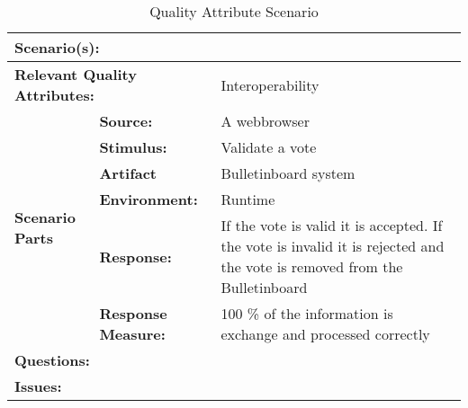 \begin{table}[H]
\begin{center}
\begin{tabular}{|p{0.3cm}|p{2.5cm}|p{8cm}|}
  \hline
  \multicolumn{2}{|p{3cm}|}{\bfseries Scenario(s):} & \\
  \hline
  \multicolumn{2}{|p{3cm}|}{\bfseries Relevant Quality Attributes:} & Interoperability\\
  \hline
  \multirow{6}{*}{\begin{sideways}{\bfseries Scenario Parts}\end{sideways}}
  & {\bfseries Source:} & A webbrowser \\
  \cline{2-3}
  & {\bfseries Stimulus:} & Validate a vote \\
  \cline{2-3}
  & {\bfseries Artifact} &  Bulletinboard system \\
  \cline{2-3}
  & {\bfseries Environment:} &  Runtime \\
  \cline{2-3}
  & {\bfseries Response:} &  If the vote is valid it is accepted. If the vote is invalid it is rejected and the vote is removed from the Bulletinboard \\
  \cline{2-3}
  & {\bfseries Response Measure:} & 100 \% of the information is exchange and processed correctly \\
  \hline
  \multicolumn{2}{|p{3cm}|}{\bfseries Questions:} &  \\
  \hline
  \multicolumn{2}{|p{3cm}|}{\bfseries Issues:} &  \\
  \hline
\end{tabular}
\caption{Quality Attribute Scenario}
\end{center}
\end{table}



